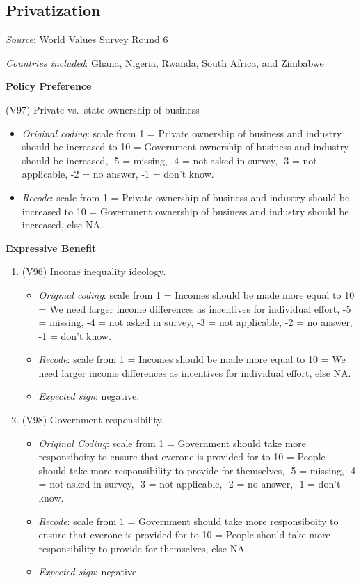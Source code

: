 \documentclass[]{article}
\begin{document}
\subsection{Privatization}\label{privatization}

\textit{Source}: World Values Survey Round 6

\textit{Countries included}: Ghana, Nigeria, Rwanda, South Africa, and
Zimbabwe

\textbf{Policy Preference}

(V97) Private vs.~state ownership of business

\begin{itemize}

\item \textit{Original coding}: scale from 1 = Private ownership of business and industry should be increased to 10 = Government ownership of business and industry should be increased, -5 = missing, -4 = not asked in survey, -3 = not applicable, -2 = no answer, -1 = don't know.

\item \textit{Recode}: scale from 1 = Private ownership of business and industry should be increased to 10 = Government ownership of business and industry should be increased, else NA.

\end{itemize}

\textbf{Expressive Benefit}

\begin{enumerate}
  \item (V96) Income inequality ideology. 
  \begin{itemize}
  \item \textit{Original coding}: scale from 1 = Incomes should be made more equal to 10 = We need larger income differences as incentives for individual effort, -5 = missing, -4 = not asked in survey, -3 = not applicable, -2 = no answer, -1 = don't know.
  \item \textit{Recode}: scale from 1 = Incomes should be made more equal to 10 = We need larger income differences as incentives for individual effort, else NA.
  \item \textit{Expected sign}: negative.
  \end{itemize}
  \item (V98) Government responsibility. 
  \begin{itemize}
  \item \textit{Original Coding}: scale from 1 = Government should take more responsiboity to ensure that everone is provided for to 10 = People should take more responsibility to provide for themselves, -5 = missing, -4 = not asked in survey, -3 = not applicable, -2 = no answer, -1 = don't know. 
  \item \textit{Recode}: scale from 1 = Government should take more responsiboity to ensure that everone is provided for to 10 = People should take more responsibility to provide for themselves, else NA.
  \item \textit{Expected sign}: negative.
  \end{itemize}
\end{enumerate}
\end{document}

